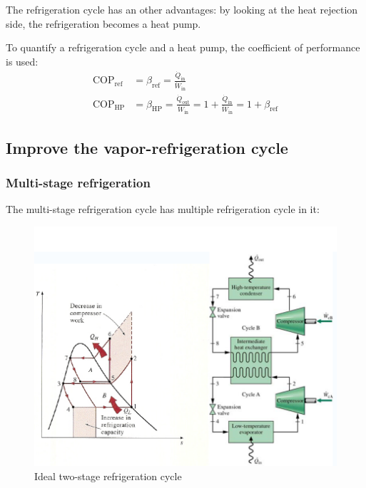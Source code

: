 \documentclass[10pt, twocolumn]{article}
\begin{document}
The refrigeration cycle has an other advantages: by looking at the heat rejection side, the refrigeration becomes a heat pump.


To quantify a refrigeration cycle and a heat pump, the coefficient of performance is used:
\begin{align*}
  \mathrm{COP}_\mathrm{ref} & = \beta_\mathrm{ref} = \frac{\dot{Q}_\mathrm{in}}{\dot{W}_\mathrm{in}}                                                                                \\
  \mathrm{COP}_\mathrm{HP}  & = \beta_\mathrm{HP} = \frac{\dot{Q}_\mathrm{out}}{\dot{W}_\mathrm{in}} = 1 + \frac{\dot{Q}_\mathrm{in}}{\dot{W}_\mathrm{in}} = 1 + \beta_\mathrm{ref}
\end{align*}

\subsection{Improve the vapor-refrigeration cycle}
\subsubsection{Multi-stage refrigeration}
The multi-stage refrigeration cycle has multiple refrigeration cycle in it:

\begin{figure}[ht] %
  \centering
  \caption{Ideal two-stage refrigeration cycle}
  \label{fig:ideal-two-stage-refrigeration}
  \includegraphics[width = 0.9\linewidth]{../../images/mech/mech-351/ideal-2-stage-refrigeration-cycle.png}
\end{figure}
\end{document}
